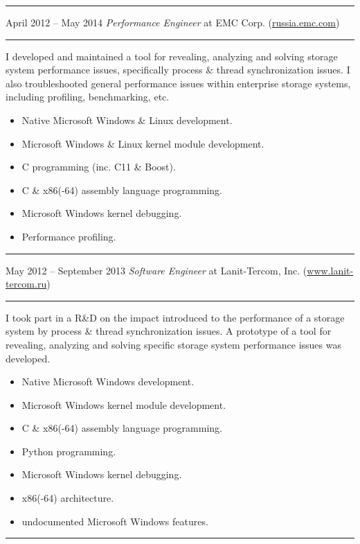 \documentclass[11pt]{article}
\newcommand\CXX{C\nolinebreak[4]\hspace{-.05em}\raisebox{.4ex}{\relsize{-3}{\textbf{++}}}}
\newcommand\CvSmallSkipLength{0.5em}
\newcommand\CvSkip[1]{\vspace{#1}}
\newcommand\CvSmallSkip{\CvSkip{\CvSmallSkipLength}}
\newcommand\CvRule{\begingroup\color{CvRuleColor}\hrule\endgroup}
\newcommand\CvWorkplaceHeader[5]{\begingroup%
  \CvRule\nopagebreak%
  \fboxsep0pt%
  \colorbox{CvWorkplaceHeaderColor}{%
    \begin{minipage}{\linewidth-2\fboxsep}%
\CvSmallSkip%
#1 -- #2 \hfill \textit{#3} at #4 (\href{http://#5/}{#5})%
\CvSmallSkip%
    \end{minipage}%
  }%
  \CvRule%
\endgroup%
}
\newenvironment{CvWorkplaceDescription}{%
    \begingroup\setlength\parskip{\CvSmallSkipLength}%
  }{%
    \CvSmallSkip\endgroup%
  }
\begin{document}
\CvWorkplaceHeader{April 2012}{May 2014}{Performance Engineer}{EMC Corp.}{russia.emc.com}

\begin{CvWorkplaceDescription}
I developed and maintained a tool for revealing, analyzing and solving storage
system performance issues, specifically process \& thread synchronization
issues.
I also troubleshooted general performance issues within enterprise storage
systems, including profiling, benchmarking, etc.

\begin{itemize}[noitemsep]
  \item Native Microsoft Windows \& Linux development.
  \item Microsoft Windows \& Linux kernel module development.
  \item {\CXX} programming (inc. {\CXX}11 \& Boost).
  \item C \& x86(-64) assembly language programming.
  \item Microsoft Windows kernel debugging.
  \item Performance profiling.
\end{itemize}
\end{CvWorkplaceDescription}

\CvWorkplaceHeader{May 2012}{September 2013}{Software Engineer}{Lanit-Tercom, Inc.}{www.lanit-tercom.ru}

\begin{CvWorkplaceDescription}
I took part in a R\&D on the impact introduced to the performance of a storage
system by process \& thread synchronization issues.
A prototype of a tool for revealing, analyzing and solving specific storage
system performance issues was developed.

\begin{itemize}[noitemsep]
  \item Native Microsoft Windows development.
  \item Microsoft Windows kernel module development.
  \item C \& x86(-64) assembly language programming.
  \item Python programming.
  \item Microsoft Windows kernel debugging.
  \item x86(-64) architecture.
  \item undocumented Microsoft Windows features.
\end{itemize}
\end{CvWorkplaceDescription}
\CvRule
\end{document}
